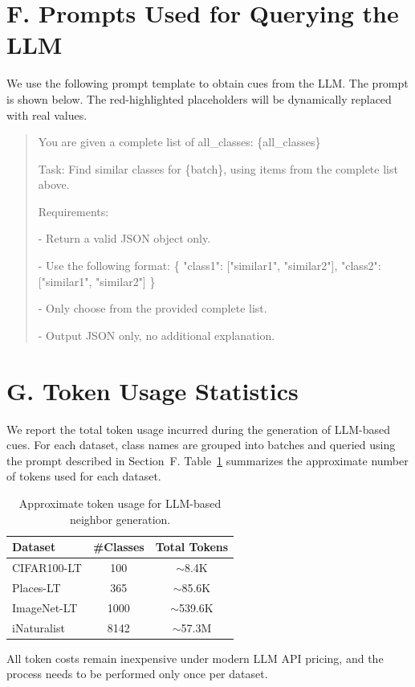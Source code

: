 \section*{F. Prompts Used for Querying the LLM}

We use the following prompt template to obtain cues from the LLM.
The prompt is shown below. The red-highlighted placeholders will be dynamically replaced with real values.

\begin{quote}
\ttfamily
You are given a complete list of all\_classes: \colorbox{red!25}{\{all\_classes\}}

Task: Find similar classes for \colorbox{red!25}{\{batch\}}, using items from the 
complete list above.

Requirements:

- Return a valid JSON object only.

- Use the following format:
\{
  "class1": ["similar1", "similar2"],
  "class2": ["similar1", "similar2"]
\}

- Only choose from the provided complete list.

- Output JSON only, no additional explanation.
\end{quote}




\section*{G. Token Usage Statistics}
We report the total token usage incurred during the generation of LLM-based 
cues. For each dataset, class names are grouped into batches and queried using the prompt described in Section~F. Table~\ref{tab:token_cost} 
summarizes the approximate number of tokens used for each dataset.

\begin{table}[h]
\centering
\caption{Approximate token usage for LLM-based neighbor generation.}
\label{tab:token_cost}
\small
\begin{tabular}{l|c|c}
\toprule
\textbf{Dataset} & \textbf{\#Classes} & \textbf{Total Tokens} \\
\midrule
CIFAR100-LT  & 100  & $\sim$8.4K \\
Places-LT    & 365  & $\sim$85.6K \\
ImageNet-LT  & 1000 & $\sim$539.6K \\
iNaturalist  & 8142 & $\sim$57.3M \\
\bottomrule
\end{tabular}
\end{table}

All token costs remain inexpensive under modern LLM API pricing, and 
the process needs to be performed only once per dataset.
